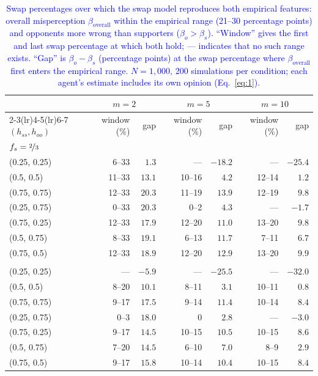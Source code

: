 \begin{table}[H]
\centering
\small
\caption{\textcolor{blue}{Swap percentages over which the swap model reproduces both empirical features: overall misperception $\beta_{\mathrm{overall}}$ within the empirical range (21--30 percentage points) and opponents more wrong than supporters ($\beta_o > \beta_s$). ``Window'' gives the first and last swap percentage at which both hold; --- indicates that no such range exists. ``Gap'' is $\beta_o - \beta_s$ (percentage points) at the swap percentage where $\beta_{\mathrm{overall}}$ first enters the empirical range. $N = 1{,}000$, 200 simulations per condition; each agent's estimate includes its own opinion (Eq.~\eqref{eq:1}).}}
\label{tab:ordering-window}
\begin{tabular}{l rr rr rr}
\toprule
 & \multicolumn{2}{c}{$m=2$} & \multicolumn{2}{c}{$m=5$} & \multicolumn{2}{c}{$m=10$} \\
\cmidrule(lr){2-3}\cmidrule(lr){4-5}\cmidrule(lr){6-7}
$(h_{ss}, h_{oo})$ & window (\%) & gap & window (\%) & gap & window (\%) & gap \\
\midrule
\multicolumn{7}{l}{\textit{$f_s = \nicefrac{2}{3}$}} \\
\quad (0.25, 0.25) & 6--33 & $1.3$ & --- & $-18.2$ & --- & $-25.4$ \\
\quad (0.5, 0.5) & 11--33 & $13.1$ & 10--16 & $4.2$ & 12--14 & $1.2$ \\
\quad (0.75, 0.75) & 12--33 & $20.3$ & 11--19 & $13.9$ & 12--19 & $9.8$ \\
\quad (0.25, 0.75) & 0--33 & $20.3$ & 0--2 & $4.3$ & --- & $-1.7$ \\
\quad (0.75, 0.25) & 12--33 & $17.9$ & 12--20 & $11.0$ & 13--20 & $9.8$ \\
\quad (0.5, 0.75) & 8--33 & $19.1$ & 6--13 & $11.7$ & 7--11 & $6.7$ \\
\quad (0.75, 0.5) & 12--33 & $18.9$ & 12--20 & $12.9$ & 13--20 & $9.9$ \\
\addlinespace
\multicolumn{7}{l}{\textit{$f_s = 0.8$}} \\
\quad (0.25, 0.25) & --- & $-5.9$ & --- & $-25.5$ & --- & $-32.0$ \\
\quad (0.5, 0.5) & 8--20 & $10.1$ & 8--11 & $3.1$ & 10--11 & $0.8$ \\
\quad (0.75, 0.75) & 9--17 & $17.5$ & 9--14 & $11.4$ & 10--14 & $8.4$ \\
\quad (0.25, 0.75) & 0--3 & $18.0$ & 0 & $2.8$ & --- & $-3.0$ \\
\quad (0.75, 0.25) & 9--17 & $14.5$ & 10--15 & $10.5$ & 10--15 & $8.6$ \\
\quad (0.5, 0.75) & 7--20 & $14.5$ & 6--10 & $7.0$ & 8--9 & $2.9$ \\
\quad (0.75, 0.5) & 9--17 & $15.8$ & 10--14 & $10.4$ & 10--15 & $8.4$ \\
\bottomrule
\end{tabular}
\end{table}
